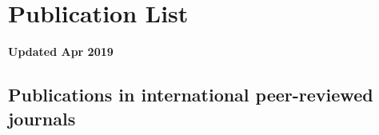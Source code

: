 \renewcommand\evenpagerightmark{{\scshape\small Appendix A}}
\renewcommand\oddpageleftmark{{\scshape\small Publication List}}



\chapter[Publication List]{Publication List}
\label{app1}

\textbf{Updated Apr 2019}
\npar
\section*{Publications in international peer-reviewed journals}


